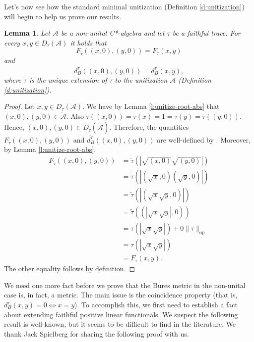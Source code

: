 \documentclass{amsart}
\theoremstyle{plain}
\newtheorem{lemma}[theorem]{Lemma}
\theoremstyle{definition}
\theoremstyle{remark}
\numberwithin{equation}{section}
\newcommand{\A}{{\mathcal{A}}}
\newcommand{\wt}[1]{{\widetilde{#1}}}
\begin{document}
Let's now see how the standard minimal unitization (Definition \ref{d:unitization}) will begin to help us prove our results.

\begin{lemma}\label{l:bures-unitization}
     Let $\A$ be a non-unital C*-algebra and let $\tau$ be a faithful trace. For every $x,y \in D_\tau(\A)$ it holds that
     \[
     F_{\wt{\tau}}((x,0),(y,0))=F_\tau(x,y)
     \]
     and 
     \[
     d_B^{\wt{\tau}}((x,0), (y,0))=d_B^\tau(x,y),
     \]
     where $\wt{\tau}$ is the unique extension of $\tau $ to the unitization $\wt{\A}$ (Definition \ref{d:unitization}).
\end{lemma}
\begin{proof}
    Let $x,y\in D_\tau(\A)$. We have  by Lemma \ref{l:unitize-root-abs} that $(x,0),(y,0)\in \wt{\A}$. Also $\wt{\tau}((x,0))=\tau(x)=1=\tau(y)=\wt{\tau}((y,0))$.  Hence, $(x,0),(y,0)\in D_{\wt{\tau}}\left( \wt{\A}\right)$. Therefore, the quantities $ F_{\wt{\tau}}((x,0),(y,0))$ and    $d_B^{\wt{\tau}}((x,0), (y,0)) $ are well-defined by \cite[Theorem 2.6]{Farenick-Rahaman17}. Moreover, by Lemma \ref{l:unitize-root-abs},
    \begin{align*}
F_{\wt{\tau}}((x,0),(y,0))& = \wt{\tau}\left(\left|\sqrt{(x,0)}\sqrt{(y,0)}\right|\right)\\& = \wt{\tau}\left(\left|\left(\sqrt{x},0 \right)\left(\sqrt{y},0 \right) \right| \right)\\
& = \wt{\tau}\left(\left|\left(\sqrt{x} \sqrt{y},0 \right) \right| \right)\\
& = \wt{\tau}\left(\left(\left|\sqrt{x} \sqrt{y}\right| ,0 \right) \right)\\
& = \tau\left(\left|\sqrt{x} \sqrt{y}\right|\right)+0\|\tau\|_\mathrm{op}\\
& =  \tau\left(\left|\sqrt{x} \sqrt{y}\right|\right)\\
& = F_\tau(x,y).
    \end{align*}
    The other equality follows by definition.
\end{proof}
 
We need one more fact before we prove that the Bures metric in the non-unital case is, in fact, a metric. The main issue is the coincidence property (that is, $d_B^\tau(x,y)=0\iff x=y$). To accomplish this, we first need to establish a fact about extending faithful positive linear functionals. We suspect the following result is well-known, but it seems to be difficult to find in the literature. We thank Jack Spielberg for sharing the following proof with us.
\end{document}
